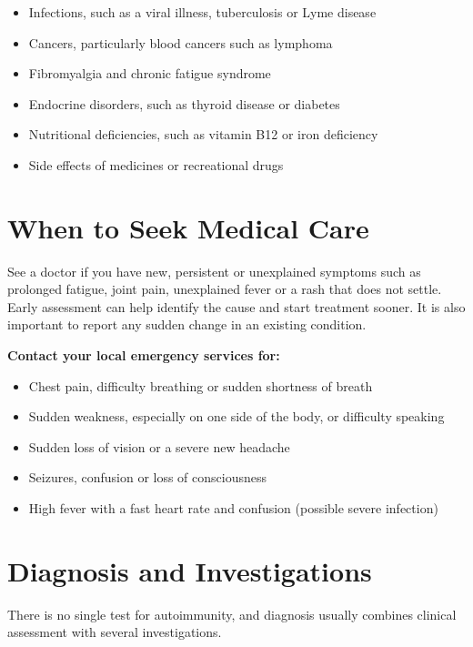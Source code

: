 \begin{itemize}
    \item Infections, such as a viral illness, tuberculosis or Lyme disease
    \item Cancers, particularly blood cancers such as lymphoma
    \item Fibromyalgia and chronic fatigue syndrome
    \item Endocrine disorders, such as thyroid disease or diabetes
    \item Nutritional deficiencies, such as vitamin B12 or iron deficiency
    \item Side effects of medicines or recreational drugs
\end{itemize}

\section*{When to Seek Medical Care}
See a doctor if you have new, persistent or unexplained symptoms such as prolonged fatigue, joint pain, unexplained fever or a rash that does not settle. Early assessment can help identify the cause and start treatment sooner. It is also important to report any sudden change in an existing condition.

\textbf{Contact your local emergency services for:}
\begin{itemize}
    \item Chest pain, difficulty breathing or sudden shortness of breath
    \item Sudden weakness, especially on one side of the body, or difficulty speaking
    \item Sudden loss of vision or a severe new headache
    \item Seizures, confusion or loss of consciousness
    \item High fever with a fast heart rate and confusion (possible severe infection)
\end{itemize}

\section*{Diagnosis and Investigations}
There is no single test for autoimmunity, and diagnosis usually combines clinical assessment with several investigations.


